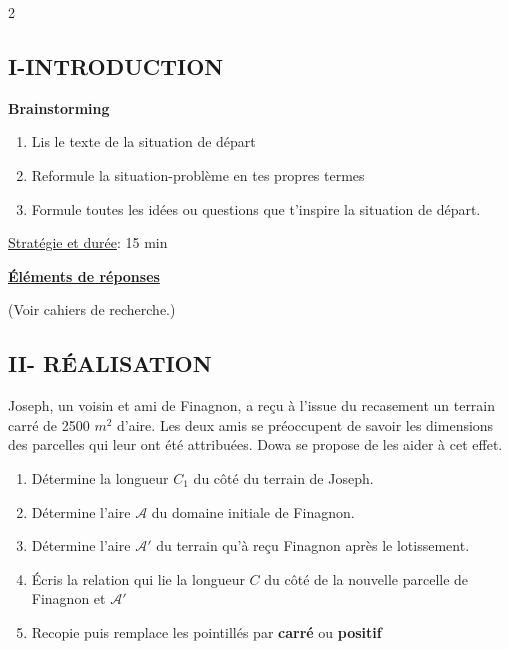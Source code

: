 \begin{multicols*}{2}
\begin{center}
  		\section*{I-INTRODUCTION}
  	\end{center}  
  	 \textbf{ Brainstorming}\\
  	\begin{enumerate}
  		\item  Lis le texte de la situation de départ 
  		\item  Reformule la situation-problème en tes 
  		propres termes 
  		\item  Formule toutes les idées ou questions que 
  		t’inspire la situation de départ.
  	\end{enumerate}
  	
  	\underline{Stratégie et durée}: 15 min
  	\begin{center}
  		\underline{\textbf{Éléments de réponses}}
  	\end{center}
  	(Voir cahiers de recherche.)
  	
  	\begin{center}
  		\section*{II- RÉALISATION}
  	\end{center}
  	
  	
  	\hspace{0.5cm} Joseph, un voisin et ami de Finagnon, a reçu à l'issue du recasement un terrain carré de 2500 $m^{2}$ d'aire. Les deux amis se préoccupent de savoir les dimensions des parcelles qui leur ont été attribuées. Dowa se propose de les aider à cet effet. 
  	
  	\begin{enumerate}
  		\item Détermine la longueur $C_{1}$ du côté du terrain de Joseph.
  		\item Détermine l'aire $\mathcal{A}$ du domaine initiale de Finagnon.
  		\item Détermine l'aire $\mathcal{A'}$ du terrain qu'à reçu  Finagnon après le lotissement.
  		\item Écris la relation qui lie la longueur $C$ du côté de la nouvelle parcelle de Finagnon et $\mathcal{A'}$ 
  		\item Recopie puis remplace les pointillés par \textbf{carré} ou \textbf{positif}
  		

\end{enumerate}
\end{multicols*}
